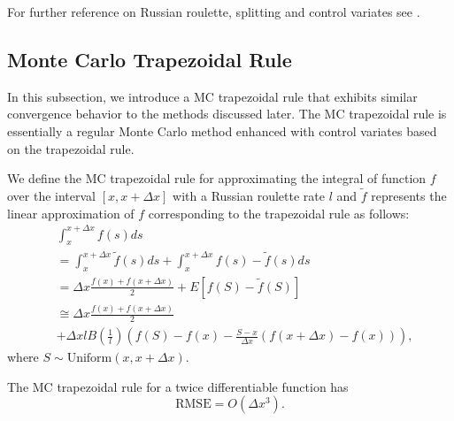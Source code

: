 \documentclass[a4paper,12pt]{article}
\begin{document}
\begin{related}[MC modification]
  For further reference on Russian roulette, splitting and control variates
  see \cite{veach_robust_1997}.
\end{related}

\subsection{Monte Carlo Trapezoidal Rule}

In this subsection, we introduce a MC trapezoidal rule that
exhibits similar convergence behavior to the methods discussed later.
The MC trapezoidal rule is essentially a regular Monte Carlo method
enhanced with control variates based on the trapezoidal rule.

\begin{definition}
  We define the MC trapezoidal rule for approximating the integral
  of function $f$ over the interval $[x, x+\Delta x]$ with a Russian roulette rate
  $l$ and $\tilde{f}$ represents the linear approximation of $f$ corresponding
  to the trapezoidal rule as follows:
  \begin{align}
     & \int_{x}^{x+\Delta x} f(s) ds                           \\
     & = \int_{x}^{x+\Delta x}  \tilde{f}(s) ds +
    \int_{x}^{x+\Delta x}  f(s) - \tilde{f}(s) ds              \\
     & = \Delta x \frac{f(x) + f(x+\Delta x)}{2}
    + E \left[f(S) - \tilde{f}(S)\right]                       \\
     & \cong \Delta x \frac{f(x) + f(x+\Delta x)}{2} \nonumber \\
     & + \Delta x l B\left( \frac{1}{l}\right)
    \left(f(S) - f(x) - \frac{S - x}{\Delta x}
    \left(f(x+\Delta x) - f(x)\right) \right), \label{eq:MCtrap}
  \end{align}
  where $S \sim \text{Uniform}(x,x+\Delta x)$.
\end{definition}

\begin{lemma} \label{lem:rmse mctrap}
  The MC trapezoidal rule
  for a twice differentiable function has
  \begin{equation}
    \text{RMSE} =O\left( \Delta x^{3} \right) .
  \end{equation}
\end{lemma}
\end{document}
